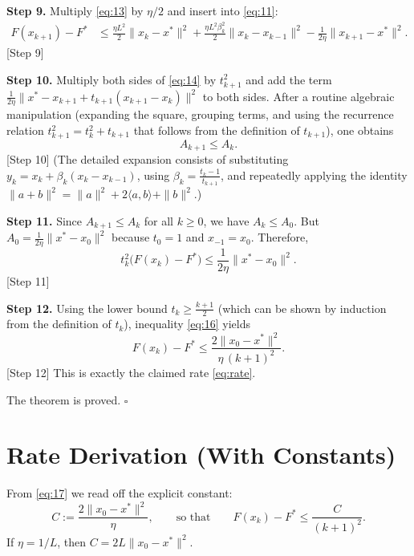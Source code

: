 \documentclass{article}
\begin{document}
\noindent\textbf{Step 9.} Multiply \eqref{eq:13} by $\eta/2$ and insert into
\eqref{eq:11}:
\[
\begin{aligned}
F(x_{k+1})-F^{*}
&\le \frac{\eta L^{2}}{2}\|x_k-x^{*}\|^{2}
+\frac{\eta L^{2}\beta_k^{2}}{2}\|x_k-x_{k-1}\|^{2}
-\frac{1}{2\eta}\|x_{k+1}-x^{*}\|^{2}. \tag{14}
\end{aligned}
\]
[Step 9]

\noindent\textbf{Step 10.} Multiply both sides of \eqref{eq:14} by $t_{k+1}^{2}$
and add the term $\frac{1}{2\eta}\|x^{*}-x_{k+1}+t_{k+1}(x_{k+1}-x_{k})\|^{2}$
to both sides. After a routine algebraic manipulation (expanding the square,
grouping terms, and using the recurrence relation
$t_{k+1}^{2}=t_{k}^{2}+t_{k+1}$ that follows from the definition of $t_{k+1}$),
one obtains
\[
A_{k+1}\le A_{k}. \tag{15}
\]
[Step 10]  (The detailed expansion consists of substituting $y_k=x_k+\beta_k(x_k-x_{k-1})$,
using $\beta_k=\frac{t_k-1}{t_{k+1}}$, and repeatedly applying the identity
$\|a+b\|^{2}= \|a\|^{2}+2\langle a,b\rangle+\|b\|^{2}$.)

\noindent\textbf{Step 11.} Since $A_{k+1}\le A_{k}$ for all $k\ge0$, we have
$A_{k}\le A_{0}$.
But $A_{0}= \frac{1}{2\eta}\|x^{*}-x_{0}\|^{2}$ because $t_{0}=1$ and $x_{-1}=x_{0}$.
Therefore,
\[
t_{k}^{2}\bigl(F(x_{k})-F^{*}\bigr)\le \frac{1}{2\eta}\|x^{*}-x_{0}\|^{2}.
\tag{16}
\]
[Step 11]

\noindent\textbf{Step 12.} Using the lower bound $t_{k}\ge\frac{k+1}{2}$ (which can be shown by induction from the definition of $t_{k}$), inequality \eqref{eq:16} yields
\[
F(x_{k})-F^{*}\le \frac{2\|x_{0}-x^{*}\|^{2}}{\eta\,(k+1)^{2}}.
\tag{17}
\]
[Step 12] This is exactly the claimed rate \eqref{eq:rate}.

\noindent The theorem is proved. \hfill $\square$

\section*{Rate Derivation (With Constants)}
From \eqref{eq:17} we read off the explicit constant:
\[
C:=\frac{2\|x_{0}-x^{*}\|^{2}}{\eta},
\qquad\text{so that}\qquad
F(x_{k})-F^{*}\le \frac{C}{(k+1)^{2}}.
\]
If $\eta=1/L$, then $C=2L\|x_{0}-x^{*}\|^{2}$.
\end{document}
